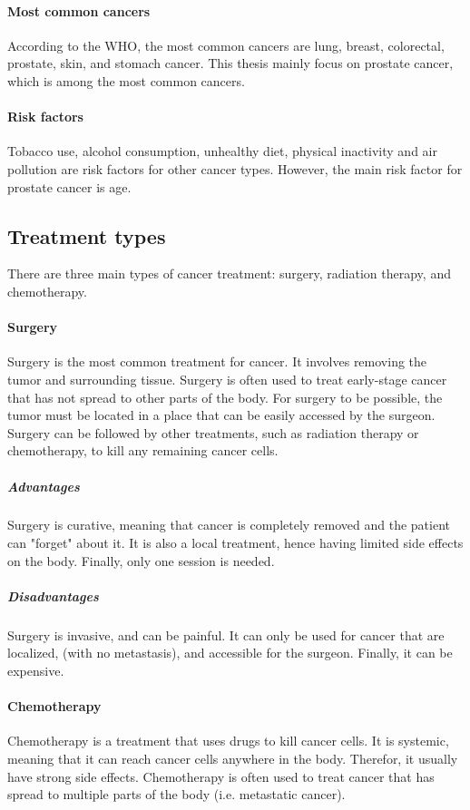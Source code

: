\paragraph{Most common cancers}
According to the WHO, the most common cancers are lung, breast, colorectal, prostate, skin, and stomach cancer.
This thesis mainly focus on prostate cancer, which is among the most common cancers.

\paragraph{Risk factors}
Tobacco use, alcohol consumption, unhealthy diet, physical inactivity and air pollution are risk factors for other cancer types.
However, the main risk factor for prostate cancer is age.

\subsection{Treatment types}

There are three main types of cancer treatment: surgery, radiation therapy, and chemotherapy.


\paragraph{Surgery}
Surgery is the most common treatment for cancer.
It involves removing the tumor and surrounding tissue.
Surgery is often used to treat early-stage cancer that has not spread to other parts of the body.
For surgery to be possible, the tumor must be located in a place that can be easily accessed by the surgeon.
Surgery can be followed by other treatments, such as radiation therapy or chemotherapy, to kill any remaining cancer cells.

\subparagraph{Advantages}
Surgery is curative, meaning that cancer is completely removed and the patient can "forget" about it.
It is also a local treatment, hence having limited side effects on the body.
Finally, only one session is needed.

\subparagraph{Disadvantages}
Surgery is invasive, and can be painful.
It can only be used for cancer that are localized, (with no metastasis), and accessible for the surgeon.
Finally, it can be expensive.

\paragraph{Chemotherapy}
Chemotherapy is a treatment that uses drugs to kill cancer cells.
It is systemic, meaning that it can reach cancer cells anywhere in the body.
Therefor, it usually have strong side effects.
Chemotherapy is often used to treat cancer that has spread to multiple parts of the body (i.e. metastatic cancer).

